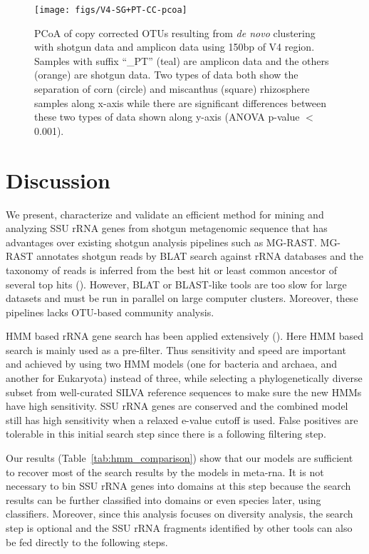 \documentclass[12pt]{article}
\begin{document}
\begin{figure}[tbph!]
  \centering
  \texttt{[image: figs/V4-SG+PT-CC-pcoa]}

\caption[PCoA of copy corrected OTUs resulting from {\em de novo} clustering with shotgun data and amplicon data using 150bp of V4 region]{PCoA of copy corrected OTUs resulting from {\em de novo} clustering with shotgun data and amplicon data using 150bp of V4 region. Samples with suffix ``\_PT'' (teal) are amplicon data and the others (orange) are shotgun data. Two types of data both show the separation of corn (circle) and miscanthus (square) rhizosphere samples along x-axis while there are significant differences between these two types of data shown along y-axis (ANOVA p-value $<$ 0.001).}

  \label{fig:V4-SG+PT-CC-pcoa}
\end{figure}


\section{Discussion}
We present, characterize and validate an efficient method for mining
and analyzing SSU rRNA genes from shotgun metagenomic sequence that
has advantages over existing shotgun analysis pipelines such as
MG-RAST. MG-RAST annotates shotgun reads by BLAT search against rRNA
databases and the taxonomy of reads is inferred from the best hit or least
common ancestor of several top hits (\cite{blast,blat,mgrast}).  However,
BLAT or BLAST-like tools are too slow for large datasets and must be
run in parallel on large computer clusters. Moreover, these
pipelines lacks OTU-based community analysis.

HMM based rRNA gene search has been applied extensively
(\cite{metarna,rrnaselector,metaxa}). Here HMM based search is mainly
used as a pre-filter. Thus sensitivity and speed are important and
achieved by using two HMM models (one for bacteria and archaea, and
another for Eukaryota) instead of three, while selecting a
phylogenetically diverse subset from well-curated SILVA reference
sequences to make sure the new HMMs have high sensitivity. SSU rRNA
genes are conserved and the combined model still has high sensitivity
when a relaxed e-value cutoff is used. False positives are tolerable in
this initial search step since there is a following filtering
step.

Our results (Table~\ref{tab:hmm_comparison}) show that our models are
sufficient to recover most of the search results by the models in
meta-rna. It is not necessary to bin SSU rRNA genes into domains at
this step because the search results can be further classified into
domains or even species later, using classifiers. Moreover, since this
analysis focuses on diversity analysis, the search step is optional
and the SSU rRNA fragments identified by other tools can also be fed
directly to the following steps.
\end{document}

